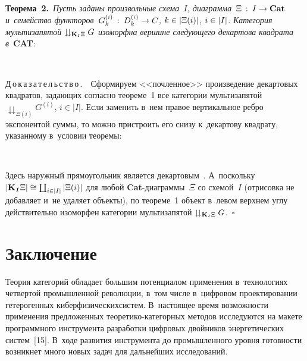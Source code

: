 \begin{multicols}{2}
\smallskip

\noindent
\textbf{Теорема~2.}\ \textit{Пусть заданы произвольные схема~$I$, 
диаграмма~$\Xi \: : \: I \hm\to \mathbf{Cat}$ и~семейство функ\-то\-ров~$G^{(i)}_k \: : \:  
D^{(i)}_k \hm\to C$, $k \hm\in \vert \Xi (i)\vert$, $i \hm\in \vert I\vert$. Категория 
муль\-ти\-за\-пя\-той $\downdownarrows_{\mathbf{K}_{\text{\bfseries\textit{1}}}\Xi} G$ изо\-морф\-на вершине 
сле\-ду\-юще\-го декартова квад\-ра\-та в}~\textbf{CAT}:

{ \begin{center} %
\vspace*{-1pt}

\mbox{%
\epsfxsize=63.716mm 
}
\vspace*{3pt}

\end{center}
}

\noindent
Д\,о\,к\,а\,з\,а\,т\,е\,л\,ь\,с\,т\,в\,о\,.\ \ Сформируем <<почленное>> произведение 
декартовых квадратов, за\-да\-ющих согласно тео\-ре\-ме~1 все категории 
мультизапятой $\downdownarrows_{\Xi (i)} G^{(i)}$, $i \in \vert I\vert$. Если 
заменить в~нем правое вертикальное реб\-ро экспонентой суммы, то можно 
пристроить его снизу к~декартову квад\-ра\-ту, указанному в~условии тео\-ре\-мы:

{ \begin{center} %
\vspace*{3pt}
\mbox{%
\epsfxsize=69.179mm 
}
\end{center}
\vspace*{3pt}

}

\noindent
Здесь наружный прямоугольник является  
декартовым~\cite[предложение 11.10]{14-kov}. А~поскольку $\vert 
\mathbf{K}_{\text{\bfseries\textit{1}}} \Xi\vert \cong \coprod_{i \in \vert I\vert} \vert \Xi (i)\vert$ для любой 
\textbf{Cat}-диа\-грам\-мы~$\Xi$ со схемой~$I$ (отрисовка не добавляет и~не 
удаляет объекты), по теореме~1 объект в~левом верхнем углу действительно 
изоморфен категории мультизапятой $\downdownarrows_{\mathbf{K}_{\text{\bfseries\textit{1}}}\Xi} G$.~$\square$

\section{Заключение}

Теория категорий обладает большим потенциалом применения в~технологиях 
четвертой промышленной революции, в~том числе в~цифровом 
проектировании гетерогенных киберфизических\linebreak \mbox{систем}. В~настоящее время 
возможности применения предложенных тео\-ре\-ти\-ко-ка\-те\-гор\-ных 
методов исследуются на макете программного инструмента разработки 
цифровых двойников энергетических \mbox{систем}~[15]. В~ходе развития 
инструмента до промышленного уровня го\-тов\-ности возникнет много новых 
задач для дальнейших исследований.


\end{multicols}

